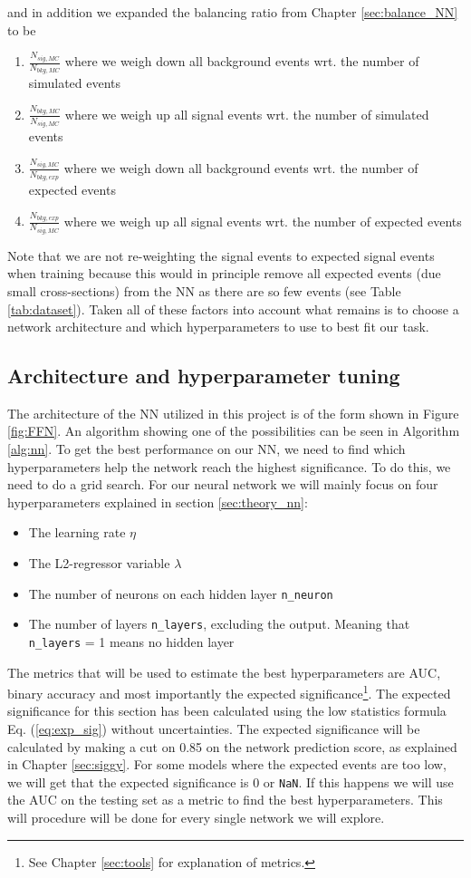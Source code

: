 \documentclass[12pt, a4paper]{book}
\begin{document}
and in addition we expanded the balancing ratio from Chapter \ref{sec:balance_NN} to be
\begin{enumerate}
   \item $\frac{N_{sig,MC}}{N_{bkg,MC}}$ where we weigh down all background events wrt. the number of simulated events
   \item $\frac{N_{bkg,MC}}{N_{sig,MC}}$ where we weigh up all signal events wrt. the number of simulated events
   \item $\frac{N_{sig,MC}}{N_{bkg,exp}}$ where we weigh down all background events wrt. the number of expected events
   \item $\frac{N_{bkg,exp}}{N_{sig,MC}}$ where we weigh up all signal events wrt. the number of expected events
\end{enumerate}
Note that we are not re-weighting the signal events to expected signal events when training because this would in principle remove all expected events (due small cross-sections) from the NN as there are so few events (see Table \ref{tab:dataset}). 
Taken all of these factors into account what remains is to choose a network architecture and which hyperparameters to use to best fit our task.


\clearpage
\subsection{Architecture and hyperparameter tuning}\label{sec:NNgriddy}
The architecture of the NN utilized in this project is of the form shown in Figure \ref{fig:FFN}. An algorithm showing one of the possibilities can be seen in Algorithm \ref{alg:nn}. To get the best performance on our NN, we need to find which hyperparameters help the network reach the highest significance. To do this, we need to do a grid search. 
For our neural network we will mainly focus on four hyperparameters explained in section \ref{sec:theory_nn}:
\begin{itemize}
   \item The learning rate $\eta$
   \item The L2-regressor variable $\lambda$
   \item The number of neurons on each hidden layer \verb|n_neuron|
   \item The number of layers \verb|n_layers|, excluding the output. Meaning that \verb|n_layers| = 1 means no hidden layer
\end{itemize}
The metrics that will be used to estimate the best hyperparameters are AUC, binary accuracy and most importantly the expected significance\footnote{See Chapter \ref{sec:tools} for explanation of metrics.}.
The expected significance for this section has been calculated using the low statistics formula Eq. (\ref{eq:exp_sig}) without uncertainties. The expected significance will be calculated by making a cut on 0.85 on the network prediction score, as explained in Chapter \ref{sec:siggy}. 
For some models where the expected events are too low, we will get that the expected significance is 0 or \verb|NaN|. If this happens we will use the AUC on the testing set as a metric to find the best hyperparameters. 
This will procedure will be done for every single network we will explore.
\clearpage
\end{document}
